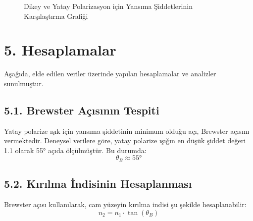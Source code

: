 \documentclass[11pt,letterpaper,twocolumn]{fenbil}
\begin{document}
\begin{figure}[H]
    \begin{center}
    \end{center}
    \caption{Dikey ve Yatay Polarizasyon için Yansıma Şiddetlerinin Karşılaştırma Grafiği} 
    \label{fig:karsilastirma}
\end{figure}

\section*{5. Hesaplamalar}
Aşağıda, elde edilen veriler üzerinde yapılan hesaplamalar ve analizler sunulmuştur.

\subsection*{5.1. Brewster Açısının Tespiti}
Yatay polarize ışık için yansıma şiddetinin minimum olduğu açı, Brewster açısını vermektedir. Deneysel verilere göre, yatay polarize ışığın en düşük şiddet değeri 1.1 olarak 55° açıda ölçülmüştür. Bu durumda:
\[
\theta_B \approx 55°
\]

\subsection*{5.2. Kırılma İndisinin Hesaplanması}
Brewster açısı kullanılarak, cam yüzeyin kırılma indisi şu şekilde hesaplanabilir:
\[
n_2 = n_1 \cdot \tan(\theta_B)
\]
\end{document}
